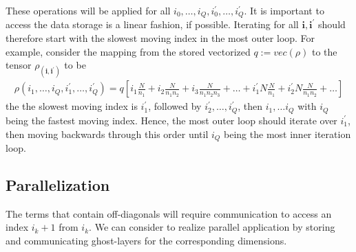 \documentclass[letterpaper]{article}
\newcommand{\bfi}{\boldsymbol{i}}
\begin{document}
  These operations will be applied for all $i_0,\dots, i_Q, i_0^\prime, \dots, i_Q^\prime$. It is important to access the data storage is a linear fashion, if possible. Iterating for all $\bfi, \bfi^\prime$ should therefore start with the slowest moving index in the most outer loop. For example, consider the mapping from the stored vectorized $q := vec(\rho)$ to the tensor $\rho_(\bfi,\bfi^\prime)$ to be
    \begin{align}
        \rho(i_1,\dots,i_Q,i_1^\prime,\dots,i_Q^\prime) = q[i_1 \frac{N}{n_1} + i_2\frac{N}{n_1n_2} + i_3\frac{N}{n_1n_2n_3} + \dots + i_1^\prime N\frac{N}{n_1} + i_2^\prime N\frac{N}{n_1n_2} + \dots]
    \end{align}
  the the slowest moving index is $i_1^\prime$, followed by $i_2^\prime, \dots, i_Q^\prime$, then $i_1, \dots i_Q$ with $i_Q$ being the fastest moving index. Hence, the most outer loop should iterate over $i_1^\prime$, then moving backwards through this order until $i_Q$ being the most inner iteration loop.

 \subsection{Parallelization} 
 The terms that contain off-diagonals will require communication to access an index $i_k+1$ from $i_k$. We can consider to realize parallel application by storing and communicating ghost-layers for the corresponding dimensions. 
\end{document}
